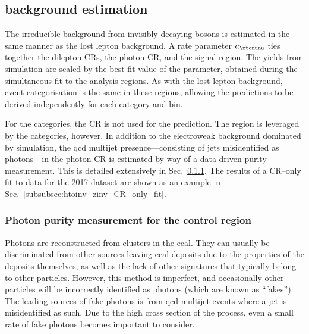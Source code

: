 

\subsection{\texorpdfstring{\ztonunupjets}{Z to nunu + jets} background estimation}
\label{subsubsec:htoinv_znunu_bkg}

The irreducible background from invisibly decaying \PZ bosons is estimated in the same manner as the lost lepton background. A rate parameter $a_{\ztonunu}$ ties together the dilepton \glspl{CR}, the photon \gls{CR}, and the signal region. The yields from simulation are scaled by the best fit value of the parameter, obtained during the simultaneous fit to the analysis regions. As with the lost lepton background, event categorisation is the same in these regions, allowing the predictions to be derived independently for each category and \ptmiss bin.

For the \ttH categories, the \singlePhotonCr \gls{CR} is not used for the \ztonunu prediction. The region is leveraged by the \VH categories, however. In addition to the electroweak background dominated by \gammapjets simulation, the \acrshort{qcd} multijet presence---consisting of \glspl{jet} misidentified as photons---in the photon \gls{CR} is estimated by way of a data-driven purity measurement. This is detailed extensively in Sec.~\ref{subsubsec:htoinv_photon_purity}. The results of a \gls{CR}--only fit to data for the 2017 dataset are shown as an example in Sec.~\ref{subsubsec:htoinv_zinv_CR_only_fit}.




\subsubsection{Photon purity measurement for the \texorpdfstring{\singlePhotonCr}{photon} control region}
\label{subsubsec:htoinv_photon_purity}

Photons are reconstructed from clusters in the \acrshort{ecal}. They can usually be discriminated from other sources leaving \acrshort{ecal} deposits due to the properties of the deposits themselves, as well as the lack of other signatures that typically belong to other particles. However, this method is imperfect, and occasionally other particles will be incorrectly identified as photons (which are known as ``fakes''). The leading sources of fake photons is from \acrshort{qcd} multijet events where a \gls{jet} is misidentified as such. Due to the high cross section of the process, even a small rate of fake photons becomes important to consider.

